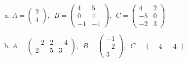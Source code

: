 \documentclass[a4paper]{article}
\begin{document}
\begin{enumerate}
   \begin{enumerate}[a)]
        \item  $A = \left( \begin{array}{c}
  2 \\[2mm]4
  \end{array} \right)$,$\,\,$ $B = \left( \begin{array}{cc}
  4 & 5 \\[2mm]0 & 4 \\[2mm]-1 & -1
  \end{array} \right)$,$\,\,$ $C = \left( \begin{array}{cc}
  4 & 2 \\[2mm]-5 & 0 \\[2mm]-2 & 3
  \end{array} \right)$
        \item  $A = \left( \begin{array}{ccc}
  -2 & 2 & -4 \\[2mm]2 & 5 & 3
  \end{array} \right)$,$\,\,$ $B = \left( \begin{array}{c}
  -1 \\[2mm]-2 \\[2mm]3
  \end{array} \right)$,$\,\,$ $C = \left( \begin{array}{cc}
  -4 & -4
  \end{array} \right)$
      \end{enumerate}
  
  
  \end{enumerate}
  
\end{document}
